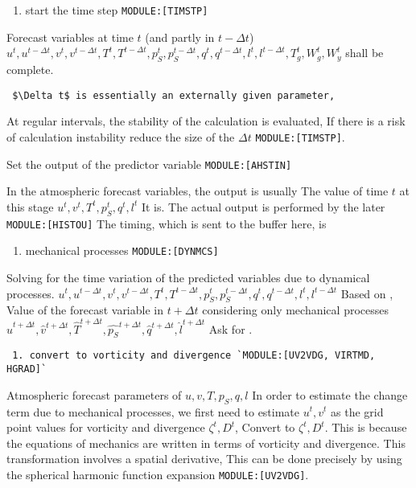 \begin{enumerate}
\def\labelenumi{\arabic{enumi}.}
\setcounter{enumi}{1}
\tightlist
\item
  start the time step \texttt{MODULE:{[}TIMSTP{]}}
\end{enumerate}

Forecast variables at time \(t\) (and partly in \(t-\Delta t\))
\(u^{t}, u^{t-\Delta t}, v^{t}, v^{t-\Delta t}, T^{t}, T^{t-\Delta t}, p_S^{t}, p_S^{t-\Delta t}, q^{t}, q^{t-\Delta t}, l^{t}, l^{t-\Delta t}, T_g^{t}, W_g^{t}, W_y^{t}\)
shall be complete.

\begin{verbatim}
 $\Delta t$ is essentially an externally given parameter,
\end{verbatim}

At regular intervals, the stability of the calculation is evaluated, If
there is a risk of calculation instability reduce the size of the
\(\Delta t\) \texttt{MODULE:{[}TIMSTP{]}}.

Set the output of the predictor variable \texttt{MODULE:{[}AHSTIN{]}}

In the atmospheric forecast variables, the output is usually The value
of time \(t\) at this stage
\(u^{t}, v^{t}, T^{t}, p_S^{t}, q^{t}, l^{t}\) It is. The actual output
is performed by the later \texttt{MODULE:{[}HISTOU{]}} The timing, which
is sent to the buffer here, is

\begin{enumerate}
\def\labelenumi{\arabic{enumi}.}
\setcounter{enumi}{3}
\tightlist
\item
  mechanical processes \texttt{MODULE:{[}DYNMCS{]}}
\end{enumerate}

Solving for the time variation of the predicted variables due to
dynamical processes.
\(u^{t}, u^{t-\Delta t}, v^{t}, v^{t-\Delta t}, T^{t}, T^{t-\Delta t}, p_S^{t}, p_S^{t-\Delta t}, q^{t}, q^{t-\Delta t}, l^{t}, l^{t-\Delta t}\)
Based on , Value of the forecast variable in \(t+\Delta t\) considering
only mechanical processes
\(\hat{u}^{t+\Delta t}, \hat{v}^{t+\Delta t}, \hat{T}^{t+\Delta t}, \hat{p_S}^{t+\Delta t}, \hat{q}^{t+\Delta t}, \hat{l}^{t+\Delta t}\)
Ask for .

\begin{verbatim}
 1. convert to vorticity and divergence `MODULE:[UV2VDG, VIRTMD, HGRAD]`
\end{verbatim}

Atmospheric forecast parameters of \(u, v, T, p_S, q, l\) In order to
estimate the change term due to mechanical processes, we first need to
estimate \(u^{t}, v^{t}\) as the grid point values for vorticity and
divergence \(\zeta^{t},D^{t}\), Convert to \(\zeta^{t},D^{t}\). This is
because the equations of mechanics are written in terms of vorticity and
divergence. This transformation involves a spatial derivative, This can
be done precisely by using the spherical harmonic function expansion
\texttt{MODULE:{[}UV2VDG{]}}.

